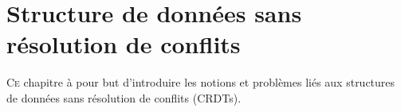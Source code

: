 
\chapter{Structure de données sans résolution de conflits}

\minitoc

\lettrine{C}e chapitre à pour but d'introduire les notions et problèmes liés aux
structures de données sans résolution de conflits (CRDTs).

